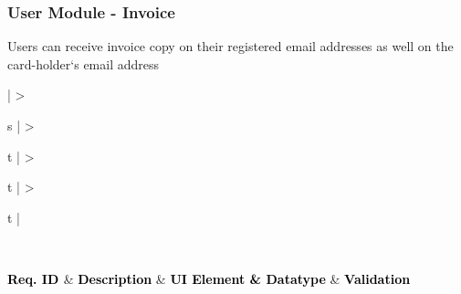 \documentclass[hidelinks,a4paper,12pt]{article}
\begin{document}
\subsubsection{User Module - Invoice}
Users can receive invoice copy on their registered email addresses as well on the card-holder`s email address

\begin{center}
	{
	\setlength{\extrarowheight}{2pt}

	\newcolumntype{b}{X}
		
	\vspace{0.25cm}
									
	\begin{tabularx}{\textwidth}{ | >{\ttfamily\raggedright\arraybackslash} s 
	| >{\ttfamily\raggedright\arraybackslash} t 
	| >{\ttfamily\raggedright\arraybackslash} t 	
	| >{\ttfamily\raggedright\arraybackslash} t | }
								
	\caption{ \textbf {\small {Requirements - User Module - Invoice}}} \\
	
	\hline
								
	{\textbf{\textcolor{black}{ {Req. ID} \newline}}} & {\textbf{\textcolor{black}{ { Description}}}} & {\textbf{\textcolor{black}{ {UI Element \& Datatype}}}} & \textbf{\textcolor{black}{ {Validation}}} \\
								

\end{tabularx}}
\end{center}
\end{document}
